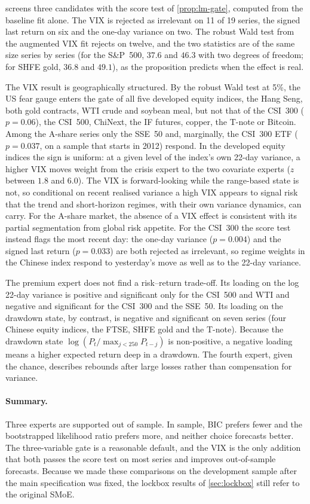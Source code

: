  screens three candidates with the score test of \cref{prop:lm-gate}, computed from
the baseline fit alone. The VIX is rejected as irrelevant on 11 of 19 series, the signed last return
on six and the one-day variance on two. The robust Wald test from the augmented VIX fit rejects on
twelve, and the two statistics are of the same size series by series (for the S\&P~500, $37.6$ and
$46.3$ with two degrees of freedom; for SHFE gold, $36.8$ and $49.1$), as the proposition predicts
when the effect is real.

The VIX result is geographically structured. By the robust Wald test at 5\%, the US fear gauge
enters the gate of all five developed equity indices, the Hang Seng, both gold contracts, WTI crude
and soybean meal, but not that of the CSI~300 ($p=0.06$), the CSI~500, ChiNext, the IF futures,
copper, the T-note or Bitcoin. Among the A-share series only the SSE~50 and, marginally, the CSI~300
ETF ($p=0.037$, on a sample that starts in 2012) respond.
 In the developed equity indices the sign is uniform: at a given level of the index's
own 22-day variance, a higher VIX moves weight from the crisis expert to the two covariate experts
($z$ between $1.8$ and $6.0$). The VIX is forward-looking while the range-based state is not, so
conditional on recent realised variance a high VIX appears to signal risk that the trend and
short-horizon regimes, with their own variance dynamics, can carry. For the A-share market, the
absence of a VIX effect is consistent with its partial segmentation from global risk appetite. For
the CSI~300 the score test instead flags the most recent day: the one-day variance ($p=0.004$) and the
signed last return ($p=0.033$) are both rejected as irrelevant, so regime weights in the Chinese
index respond to yesterday's move as well as to the 22-day variance.

The premium expert does not find a risk--return trade-off. Its loading on the log 22-day variance is
positive and significant only for the CSI~500 and WTI and negative and significant for the CSI~300
and the SSE~50. Its loading on the drawdown state, by contrast, is negative and significant on seven
series (four Chinese equity indices, the FTSE, SHFE gold and the T-note). Because the drawdown state
$\log(P_t/\max_{j<250}P_{t-j})$ is non-positive, a negative loading means a higher expected return
deep in a drawdown. The fourth expert, given the chance, describes rebounds after large losses rather
than compensation for variance.



\paragraph{Summary.} Three experts are supported out of sample. In sample, BIC prefers fewer and the
bootstrapped likelihood ratio prefers more, and neither choice forecasts better. The three-variable gate is a reasonable default, and the VIX is the only
addition that both passes the score test on most series and improves out-of-sample forecasts. Because
we made these comparisons on the development sample after the main specification was fixed, the
lockbox results of \cref{sec:lockbox} still refer to the original SMoE.
